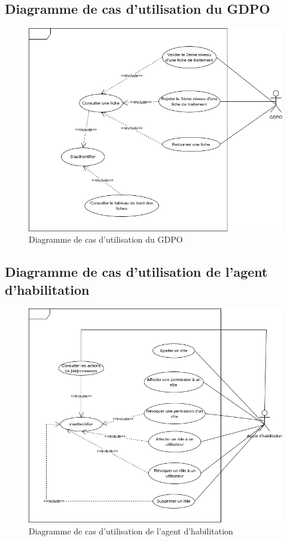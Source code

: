 \clearpage


\subsection{Diagramme de cas d'utilisation du GDPO}

\begin{figure}[H]
    \centering
    \includegraphics[width=\textwidth]{images/cas-utilisation-gdpo.png}
    \caption{Diagramme de cas d'utilisation du GDPO}
\end{figure}

\clearpage

\subsection{Diagramme de cas d'utilisation de l'agent d'habilitation}

\begin{figure}[H]
    \centering
    \includegraphics[width=\textwidth]{images/cas-utilisation-agent-habiliation.png}
    \caption{Diagramme de cas d'utilisation de l'agent d'habilitation}
\end{figure}



\clearpage